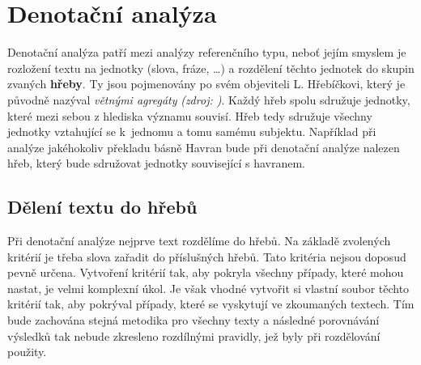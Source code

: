 \documentclass[dp.tex]{subfiles}
\begin{document}
\chapter{Denotační analýza}
\label{chap:denotacni_analyza}

Denotační analýza patří mezi analýzy referenčního typu, neboť jejím smyslem je rozložení textu na jednotky (slova, fráze, \ldots) a rozdělení těchto jednotek do skupin zvaných \textbf{hřeby}. Ty jsou pojmenovány po svém objeviteli L. Hřebíčkovi, který je původně nazýval \textit{větnými agregáty} \textit{(zdroj: \cite{Tatar2014})}. Každý hřeb spolu sdružuje jednotky, které mezi sebou z hlediska významu souvisí. Hřeb tedy sdružuje všechny jednotky vztahující se k~jednomu a tomu samému subjektu. Například při analýze jakéhokoliv překladu básně Havran bude při denotační analýze nalezen hřeb, který bude sdružovat jednotky související s havranem.

\section{Dělení textu do hřebů}

Při denotační analýze nejprve text rozdělíme do hřebů. Na základě zvolených kritérií je třeba slova zařadit do příslušných hřebů. Tato kritéria nejsou doposud pevně určena. Vytvoření kritérií tak, aby pokryla všechny případy, které mohou nastat, je velmi komplexní úkol. Je však vhodné vytvořit si vlastní soubor těchto kritérií tak, aby pokrýval případy, které se vyskytují ve zkoumaných textech. Tím bude zachována stejná metodika pro všechny texty a následné porovnávání výsledků tak nebude zkresleno rozdílnými pravidly, jež byly při rozdělování použity.
\end{document}
